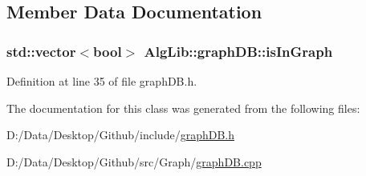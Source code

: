\subsection{Member Data Documentation}
\subsubsection[{\texorpdfstring{is\+In\+Graph}{isInGraph}}]{\setlength{\rightskip}{0pt plus 5cm}std\+::vector$<$bool$>$ Alg\+Lib\+::graph\+D\+B\+::is\+In\+Graph\hspace{0.3cm}{\ttfamily [protected]}}\hypertarget{class_alg_lib_1_1graph_d_b_adc2ea4ed0aec4a2cd22cbe292c4152ae}{}\label{class_alg_lib_1_1graph_d_b_adc2ea4ed0aec4a2cd22cbe292c4152ae}


Definition at line 35 of file graph\+D\+B.\+h.



The documentation for this class was generated from the following files\+:\begin{DoxyCompactItemize}
\item 
D\+:/\+Data/\+Desktop/\+Github/include/\hyperlink{graph_d_b_8h}{graph\+D\+B.\+h}\item 
D\+:/\+Data/\+Desktop/\+Github/src/\+Graph/\hyperlink{graph_d_b_8cpp}{graph\+D\+B.\+cpp}\end{DoxyCompactItemize}
